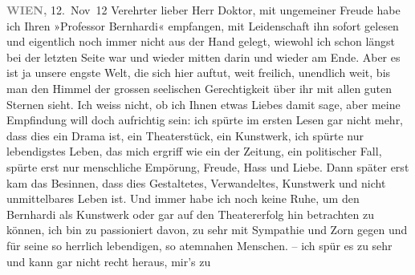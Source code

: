 \pstart
           \raggedleft{}\textcolor{gray}{\textbf{WIEN,}}{ }12. Nov 12\pend
           {\vspace{1\baselineskip}}
\pstart{}Verehrter lieber Herr Doktor,\pend\vspace{0.5em}
\pstart
           mit ungemeiner Freude habe ich Ihren »Professor
                  Bernhardi« empfangen, mit Leidenschaft ihn sofort gelesen und eigentlich noch
               immer nicht aus der Hand gelegt, wiewohl ich schon längst bei der letzten Seite war
               und wieder mitten darin und wieder am Ende. Aber es ist ja unsere engste Welt, die
               sich hier auftut, weit freilich, unendlich weit, bis man den Himmel der grossen
               seelischen Gerechtigkeit über ihr mit allen guten Sternen sieht. Ich weiss nicht, ob
               ich Ihnen etwas Liebes damit sage, aber meine Empfindung will doch aufrichtig sein:
                  {\pb}ich spürte im ersten Lesen gar nicht
               mehr, dass dies ein Drama ist, ein Theaterstück, ein Kunstwerk, ich spürte nur
               lebendigstes Leben, das mich ergriff wie ein \label{K_L03639-1v}\label{K_L03639-1} der Zeitung, ein politischer Fall, spürte erst nur
               menschliche Empörung, Freude, Hass und Liebe. Dann später erst kam das Besinnen, dass
               dies Gestaltetes, Verwandeltes, Kunstwerk und nicht unmittelbares Leben ist. Und  immer habe ich noch keine Ruhe, um den Bernhardi als Kunstwerk oder gar auf den
               Theatererfolg hin betrachten zu können, ich bin zu passioniert davon, zu sehr mit
               Sympathie und Zorn gegen und für seine so herrlich lebendigen, so atemnahen Menschen.
                  \label{K_L03639-2v}\label{K_L03639-2} – ich spür es zu sehr und {\pb}kann gar nicht recht heraus, mir’s zu
